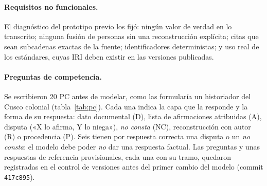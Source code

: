 \documentclass[runningheads]{llncs}
\newcommand{\ttt}[1]{\texttt{\small #1}}
\begin{document}
\paragraph{Requisitos no funcionales.}
El diagnóstico del prototipo previo los fijó: ningún valor de verdad en lo transcrito; ninguna fusión de personas sin
una reconstrucción explícita; citas que sean subcadenas exactas de la fuente; identificadores deterministas; y uso
real de los estándares, cuyas IRI deben existir en las versiones publicadas.

\paragraph{Preguntas de competencia.}
Se escribieron 20 PC antes de modelar, como las formularía un historiador del Cusco colonial
(tabla~\ref{tab:pc}). Cada una indica la capa que la responde y la forma de su respuesta: dato documental (D), lista
de afirmaciones atribuidas (A), disputa («X lo afirma, Y lo niega»), \emph{no consta} (NC), reconstrucción con autor
(R) o procedencia (P). Seis tienen por respuesta correcta una disputa o un \emph{no consta}: el modelo debe poder
\emph{no} dar una respuesta factual. Las preguntas y unas respuestas de referencia provisionales, cada una con su
tramo, quedaron registradas en el control de versiones antes del primer cambio del modelo (commit \ttt{417c895}).
\end{document}
